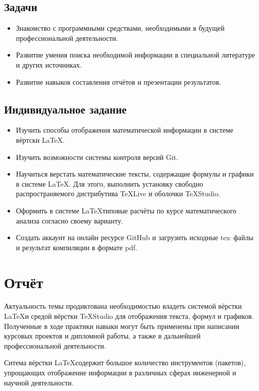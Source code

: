\documentclass[a4paper,12pt]{article} %
\begin{document}
\subsection{Задачи}
\begin{itemize}


\item Знакомство с программными средствами, необходимыми в будущей профессиональной деятельности.
\item Развитие умения поиска необходимой информации в специальной литературе и других источниках.
\item Развитие навыков составления отчётов и презентации результатов.
\end{itemize}
\subsection{Индивидуальное задание} 
\begin{itemize}
\item Изучить способы отображения математической информации в системе вёртски \LaTeX.
\item Изучить возможности системы контроля версий \textsf{Git}.
\item Научиться верстать математические тексты, содержащие формулы и графики в системе \LaTeX.
Для этого, выполнить установку свободно распространяемого дистрибутива \textsf{TeXLive} и оболочки \textsf{TeXStudio}.
\item Оформить в системе \LaTeX типовые расчёты по курсе математического анализа согласно своему варианту.
\item Создать аккаунт на онлайн ресурсе \textsf{GitHub} и загрузить исходные \textsf{tex}--файлы 
и результат компиляции в формате \textsf{pdf}.

\end{itemize} 

\newpage
\section{Отчёт}
Актуальность темы продиктована необходимостью владеть системой вёрстки \LaTeX и средой вёрстки \textsf{TeXStudio} для
отображения текста, формул и графиков. Полученные в ходе практики навыки могут быть применены при написании
курсовых проектов и дипломной работы, а также в дальнейшей профессиональной деятельности.

Ситема вёрстки \LaTeX содержит большое количество инструментов (пакетов), упрощающих отображение информации в различных 
сферах инженерной и научной деятельности. 
\end{document}
